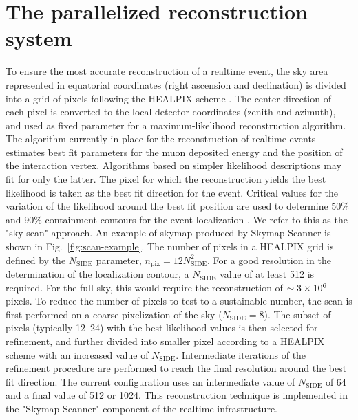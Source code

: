 \documentclass[a4paper,11pt]{article}
\begin{document}
\section{The parallelized reconstruction system}

To ensure the most accurate reconstruction of a realtime event, the sky area represented in equatorial coordinates (right ascension and declination) is divided into a grid of pixels following the HEALPIX scheme \cite{Gorski:2004by}. The center direction of each pixel is converted to the local detector coordinates (zenith and azimuth), and used as fixed parameter for a maximum-likelihood reconstruction algorithm. The algorithm currently in place for the reconstruction of realtime events \cite{IceCube:2013dkx} estimates best fit parameters for the muon deposited energy and the position of the interaction vertex. Algorithms based on simpler likelihood descriptions may fit for only the latter. The pixel for which the reconstruction yields the best likelihood is taken as the best fit direction for the event. Critical values for the variation of the likelihood around the best fit position are used to determine 50\% and 90\% containment contours for the event localization \cite{IceCube:2023icrc-RTRECO}. We refer to this as the "sky scan" approach. An example of skymap produced by Skymap Scanner is shown in Fig.~\ref{fig:scan-example}. The number of pixels in a HEALPIX grid is defined by the $N_\mathrm{SIDE}$ parameter, $n_{\mathrm{pix}} = 12 N^2_\mathrm{SIDE}$. For a good resolution in the determination of the localization contour, a $N_\mathrm{SIDE}$ value of at least 512 is required. For the full sky, this would require the reconstruction of $\sim \num{3E6}$ pixels. To reduce the number of pixels to test to a sustainable number, the scan is first performed on a coarse pixelization of the sky ($N_\mathrm{SIDE} = 8$). The subset of pixels (typically 12--24) with the best likelihood values is then selected for refinement, and further divided into smaller pixel according to a HEALPIX scheme with an increased value of $N_\mathrm{SIDE}$. Intermediate iterations of the refinement procedure are performed to reach the final resolution around the best fit direction. The current configuration uses an intermediate value of $N_\mathrm{SIDE}$ of 64 and a final value of 512 or 1024. This reconstruction technique is implemented in the "Skymap Scanner" component of the realtime infrastructure.
\end{document}
